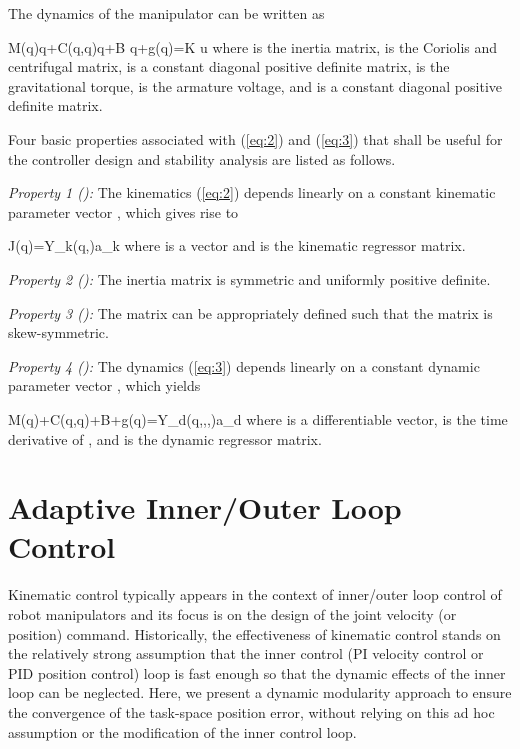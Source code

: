 \documentclass[9pt,technote]{IEEEtran}
\def \be {}
\begin{document}
The dynamics of the manipulator can be written as \cite{Spong2006_Book}
\be
\label{eq:3}
M(q)\ddot q+C(q,\dot q)\dot q+B \dot q+g(q)=K u
\ee
where  is the inertia matrix,  is the Coriolis and centrifugal matrix,  is a constant diagonal positive definite matrix,  is the gravitational torque,  is the armature voltage, and  is a constant diagonal positive definite matrix.

Four basic properties associated with (\ref{eq:2}) and (\ref{eq:3}) that shall be useful for the controller design and stability analysis are listed as follows.

\emph{Property 1 (\cite{Cheah2006_IJRR}):} The kinematics (\ref{eq:2}) depends linearly on a constant kinematic parameter vector , which gives rise to
\be
\label{eq:4}
J(q)\psi=Y_k(q,\psi)a_k
\ee
where  is a vector and  is the kinematic regressor matrix.

\emph{Property 2 (\cite{Slotine1991_Book,Spong2006_Book}):} The inertia matrix  is symmetric and uniformly positive definite.

\emph{Property 3 (\cite{Slotine1991_Book,Spong2006_Book}):} The matrix  can be appropriately defined such that the matrix  is skew-symmetric.

\emph{Property 4 (\cite{Slotine1991_Book,Spong2006_Book}):} The dynamics (\ref{eq:3}) depends linearly on a constant dynamic parameter vector , which yields
\be
\label{eq:5}
M(q)\dot \zeta+C(q,\dot q)\zeta+B\zeta+g(q)=Y_d(q,,\zeta,\dot \zeta)a_d
\ee
where  is a differentiable vector,  is the time derivative of , and  is the dynamic regressor matrix.





\section{Adaptive Inner/Outer Loop Control}

Kinematic control typically appears in the context of inner/outer loop control of robot manipulators and its focus is on the design of the joint velocity (or position) command. Historically, the effectiveness of kinematic control stands on the relatively strong assumption that the inner control (PI velocity control or PID position control) loop is fast enough so that the dynamic effects of the inner loop can be neglected. Here, we present a dynamic modularity approach to ensure the convergence of the task-space position error, without relying on this ad hoc assumption or the modification of the inner control loop.
\end{document}

